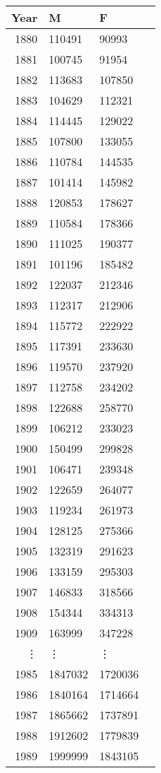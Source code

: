\documentclass[11pt]{article}
\begin{document}
    \begin{tabular}{r|lll}
 Year & M & F\\
\hline
	 1880   & 110491 &  90993\\
	 1881   & 100745 &  91954\\
	 1882   & 113683 & 107850\\
	 1883   & 104629 & 112321\\
	 1884   & 114445 & 129022\\
	 1885   & 107800 & 133055\\
	 1886   & 110784 & 144535\\
	 1887   & 101414 & 145982\\
	 1888   & 120853 & 178627\\
	 1889   & 110584 & 178366\\
	 1890   & 111025 & 190377\\
	 1891   & 101196 & 185482\\
	 1892   & 122037 & 212346\\
	 1893   & 112317 & 212906\\
	 1894   & 115772 & 222922\\
	 1895   & 117391 & 233630\\
	 1896   & 119570 & 237920\\
	 1897   & 112758 & 234202\\
	 1898   & 122688 & 258770\\
	 1899   & 106212 & 233023\\
	 1900   & 150499 & 299828\\
	 1901   & 106471 & 239348\\
	 1902   & 122659 & 264077\\
	 1903   & 119234 & 261973\\
	 1904   & 128125 & 275366\\
	 1905   & 132319 & 291623\\
	 1906   & 133159 & 295303\\
	 1907   & 146833 & 318566\\
	 1908   & 154344 & 334313\\
	 1909   & 163999 & 347228\\
	 ⋮ & ⋮ & ⋮\\
	 1985    & 1847032 & 1720036\\
	 1986    & 1840164 & 1714664\\
	 1987    & 1865662 & 1737891\\
	 1988    & 1912602 & 1779839\\
	 1989    & 1999999 & 1843105\\

\end{tabular}
\end{document}

